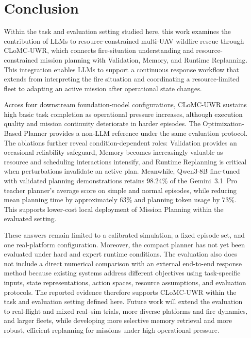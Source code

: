 \section{Conclusion}

Within the task and evaluation setting studied here, this work examines the
contribution of LLMs to resource-constrained multi-UAV wildfire rescue through
CLoMC-UWR, which connects fire-situation understanding and resource-constrained
mission planning with Validation, Memory, and Runtime Replanning. This
integration enables LLMs to support a continuous response workflow that extends
from interpreting the fire situation and coordinating a resource-limited fleet
to adapting an active mission after operational state changes.

Across four downstream foundation-model configurations, CLoMC-UWR sustains high
basic task completion as operational pressure increases, although execution
quality and mission continuity deteriorate in harder episodes. The
Optimization-Based Planner provides a non-LLM reference under the same
evaluation protocol. The ablations further reveal condition-dependent roles:
Validation provides an occasional reliability safeguard, Memory becomes
increasingly valuable as resource and scheduling interactions intensify, and
Runtime Replanning is critical when perturbations invalidate an active plan.
Meanwhile, Qwen3-8B fine-tuned with validated planning demonstrations retains
98.24\% of the Gemini~3.1~Pro teacher planner's average score on simple and
normal episodes, while reducing mean planning time by approximately 63\% and
planning token usage by 73\%. This supports lower-cost local deployment of
Mission Planning within the evaluated setting.

These answers remain limited to a calibrated simulation, a fixed
episode set, and one real-platform configuration. Moreover, the compact
planner has not yet been evaluated under hard and expert runtime conditions.
The evaluation also does not include a direct numerical comparison with an
external end-to-end response method because existing systems address different
objectives using task-specific inputs, state representations, action spaces,
resource assumptions, and evaluation protocols. The
reported evidence therefore supports CLoMC-UWR within the task and
evaluation setting defined here. Future work will extend the evaluation to
real-flight and mixed real--sim trials, more diverse platforms and fire
dynamics, and larger fleets, while developing more selective memory retrieval
and more robust, efficient replanning for missions under high operational
pressure.

\endinput
